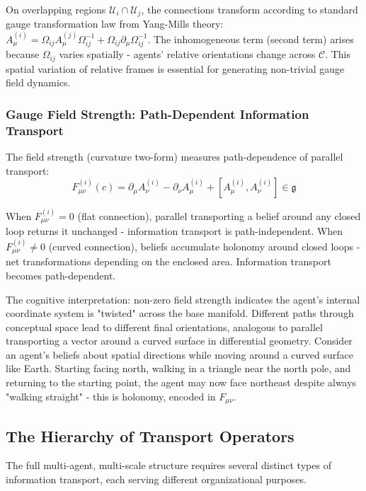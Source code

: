 \documentclass[11pt]{article}
\begin{document}
On overlapping regions $\mathcal{U}_i \cap \mathcal{U}_j$, the connections transform according to standard gauge transformation law from Yang-Mills theory: $A^{(i)}_\mu = \Omega_{ij} A^{(j)}_\mu \Omega_{ij}^{-1} + \Omega_{ij} \partial_\mu \Omega_{ij}^{-1}$. The inhomogeneous term (second term) arises because $\Omega_{ij}$ varies spatially - agents' relative orientations change across $\mathcal{C}$. This spatial variation of relative frames is essential for generating non-trivial gauge field dynamics.

\subsubsection{Gauge Field Strength: Path-Dependent Information Transport}

The field strength (curvature two-form) measures path-dependence of parallel transport:
\begin{equation}
F^{(i)}_{\mu\nu}(c) = \partial_\mu A^{(i)}_\nu - \partial_\nu A^{(i)}_\mu + [A^{(i)}_\mu, A^{(i)}_\nu] \in \mathfrak{g}
\end{equation}

When $F^{(i)}_{\mu\nu} = 0$ (flat connection), parallel transporting a belief around any closed loop returns it unchanged - information transport is path-independent. When $F^{(i)}_{\mu\nu} \neq 0$ (curved connection), beliefs accumulate holonomy around closed loops - net transformations depending on the enclosed area. Information transport becomes path-dependent.

The cognitive interpretation: non-zero field strength indicates the agent's internal coordinate system is "twisted" across the base manifold. Different paths through conceptual space lead to different final orientations, analogous to parallel transporting a vector around a curved surface in differential geometry. Consider an agent's beliefs about spatial directions while moving around a curved surface like Earth. Starting facing north, walking in a triangle near the north pole, and returning to the starting point, the agent may now face northeast despite always "walking straight" - this is holonomy, encoded in $F_{\mu\nu}$.

\subsection{The Hierarchy of Transport Operators}

The full multi-agent, multi-scale structure requires several distinct types of information transport, each serving different organizational purposes.
\end{document}
